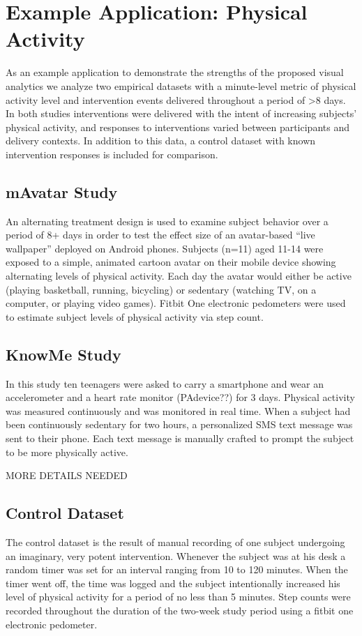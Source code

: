 \documentclass[review,journal]{vgtc}         %
\begin{document}
\section{Example Application: Physical Activity}
As an example application to demonstrate the strengths of the proposed visual analytics we analyze two empirical datasets with a minute-level metric of physical activity level and intervention events delivered throughout a period of >8 days.
In both studies interventions were delivered with the intent of increasing subjects’ physical activity, and responses to interventions varied between participants and delivery contexts.
In addition to this data, a control dataset with known intervention responses is included for comparison.

\subsection{mAvatar Study}
An alternating treatment design is used to examine subject behavior over a period of 8+ days in order to test the effect size of an avatar-based “live wallpaper” deployed on Android phones.
Subjects (n=11) aged 11-14 were exposed to a simple, animated cartoon avatar on their mobile device showing alternating levels of physical activity.
Each day the avatar would either be active (playing basketball, running, bicycling) or sedentary (watching TV, on a computer, or playing video games).
Fitbit One electronic pedometers were used to estimate subject levels of physical activity via step count.

\subsection{KnowMe Study}
In this study ten teenagers were asked to carry a smartphone and wear an accelerometer and a heart rate monitor (PAdevice??) for 3 days.
Physical activity was measured continuously and was monitored in real time.
When a subject had been continuously sedentary for two hours, a personalized SMS text message was sent to their phone.
Each text message is manually crafted to prompt the subject to be more physically active.

MORE DETAILS NEEDED

\subsection{Control Dataset}
The control dataset is the result of manual recording of one subject undergoing an imaginary, very potent intervention.
Whenever the subject was at his desk a random timer was set for an interval ranging from 10 to 120 minutes.
When the timer went off, the time was logged and the subject intentionally increased his level of physical activity for a period of no less than 5 minutes.
Step counts were recorded throughout the duration of the two-week study period using a fitbit one electronic pedometer.
\end{document}
